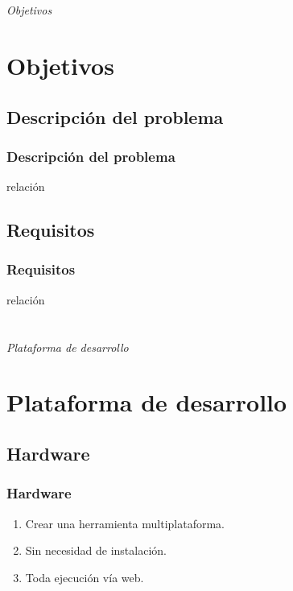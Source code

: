 \documentclass{beamer}
\begin{document}
\section*{}
\begin{frame}{}
	\centering \Huge
	\emph{Objetivos}
\end{frame}

\section{Objetivos}
\subsection{Descripción del problema}
\begin{frame}
	\frametitle{Descripción del problema}
	\begin{outline}
	\1 relación
	\end{outline}
\end{frame}

\subsection{Requisitos}
\begin{frame}
	\frametitle{Requisitos}
	\begin{outline}
	\1 relación
	\end{outline}
\end{frame}


\section*{}
\begin{frame}{}
	\centering \Huge
	\emph{Plataforma de desarrollo}
\end{frame}

\section{Plataforma de desarrollo}
\subsection{Hardware}
\begin{frame}
		\frametitle{Hardware}
	\begin{enumerate}
	\item Crear una herramienta multiplataforma.
	\item Sin necesidad de instalación.
	\item Toda ejecución vía web.
	\end{enumerate}
\end{frame}
\end{document}

